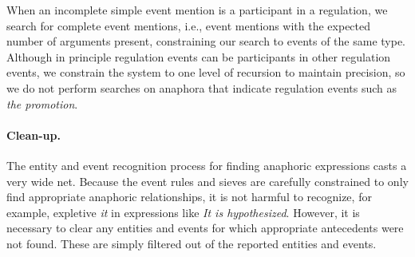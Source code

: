 When an incomplete simple event mention is a participant in a regulation, we search for complete event mentions, i.e., event mentions with the expected number of arguments present, constraining our search to events of the same type. Although in principle regulation events can be participants in other regulation events, we constrain the system to one level of recursion to maintain precision, so we do not perform searches on anaphora that indicate regulation events such as {\it the promotion}.

\paragraph{Clean-up.}

The entity and event recognition process for finding anaphoric expressions casts a very wide net. Because the event rules and sieves are carefully constrained to only find appropriate anaphoric relationships, it is not harmful to recognize, for example, expletive {\it it} in expressions like {\it It is hypothesized\textellipsis}. However, it is necessary to clear any entities and events for which appropriate antecedents were not found. These are simply filtered out of the reported entities and events.


